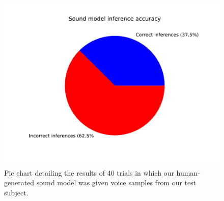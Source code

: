 \documentclass{article}
\begin{document}
\begin{figure}
\begin{center}
\centerline{\includegraphics[width=\columnwidth]{sound_model_accuracy_chart}}
\caption{Pie chart detailing the results of 40 trials in which our human-generated sound model was given voice samples from our test subject.}
\end{center}
\end{figure}
\end{document}
